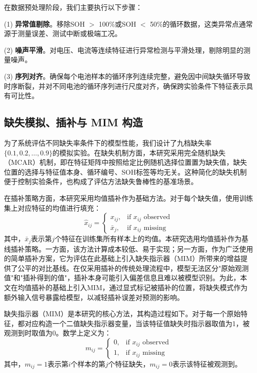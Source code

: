\documentclass[10pt,a4paper]{ctexart}
\begin{document}
在数据预处理阶段，我们主要执行以下步骤：

(1) \textbf{异常值剔除}。移除SOH $>$ 100\%或SOH $<$ 50\%的循环数据，这类异常点通常源于测量误差、测试中断或极端工况。

(2) \textbf{噪声平滑}。对电压、电流等连续特征进行异常检测与平滑处理，剔除明显的测量噪声。

(3) \textbf{序列对齐}。确保每个电池样本的循环序列连续完整，避免因中间缺失循环导致时序断裂，并对不同电池的循环序列进行尺度对齐，确保跨实验条件下特征表示具有可比性。

\subsection{缺失模拟、插补与 MIM 构造}

为了系统评估不同缺失率条件下的模型性能，我们设计了九档缺失率$\{0.1, 0.2, \ldots, 0.9\}$的模拟实验。在缺失机制方面，本研究采用完全随机缺失（MCAR）机制，即在特征矩阵中按照给定比例随机选择位置置为缺失值，缺失位置的选择与特征值本身、循环编号、SOH标签等均无关。这种简化的缺失机制便于控制实验条件，也构成了评估方法缺失鲁棒性的基准场景。

在插补策略方面，本研究采用均值插补作为基础方法。对于每个缺失值，使用训练集上对应特征的均值进行填充：
\begin{equation}
    \hat{x}_{ij} = \begin{cases}
        x_{ij}, & \text{if } x_{ij} \text{ observed} \\
        \bar{x}_j, & \text{if } x_{ij} \text{ missing}
    \end{cases}
\end{equation}
其中，$\bar{x}_j$表示第$j$个特征在训练集所有样本上的均值。本研究选用均值插补作为基线插补策略。一方面，该方法计算成本较低、易于实现；另一方面，作为广泛使用的简单插补方案，它为评估在此基础上引入缺失指示器（MIM）所带来的增益提供了公平的对比基线。在仅采用插补的传统处理流程中，模型无法区分"原始观测值"和"插补得到的值"，插补本身可能引入偏差信息且难以被模型识别。为此，本文在均值插补的基础上引入MIM，通过显式标记被插补的位置，将缺失模式作为额外输入信号暴露给模型，以减轻插补误差对预测的影响。

缺失指示器（MIM）是本研究的核心方法，其构造过程如下。对于每一个原始特征，都对应构造一个二值缺失指示器变量，当该特征值缺失时指示器取值为1，被观测到时取值为0。数学上定义为：
\begin{equation}
    m_{ij} = 
    \begin{cases}
        0, & \text{if } x_{ij} \text{ observed} \\
        1, & \text{if } x_{ij} \text{ missing}
    \end{cases}
\end{equation}
其中，$m_{ij}=1$表示第$i$个样本的第$j$个特征缺失，$m_{ij}=0$表示该特征被观测到。
\end{document}
